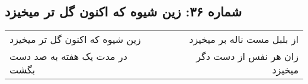 \begin{center}
\section*{شماره ۳۶: زین شیوه که اکنون گل تر میخیزد}
\label{sec:036}
\begin{longtable}{l p{0.5cm} r}
زین شیوه که اکنون گل تر میخیزد
&&
از بلبل مست ناله بر میخیزد
\\
در مدت یک هفته به صد دست بگشت
&&
زان هر نفس از دست دگر میخیزد
\\
\end{longtable}
\end{center}
